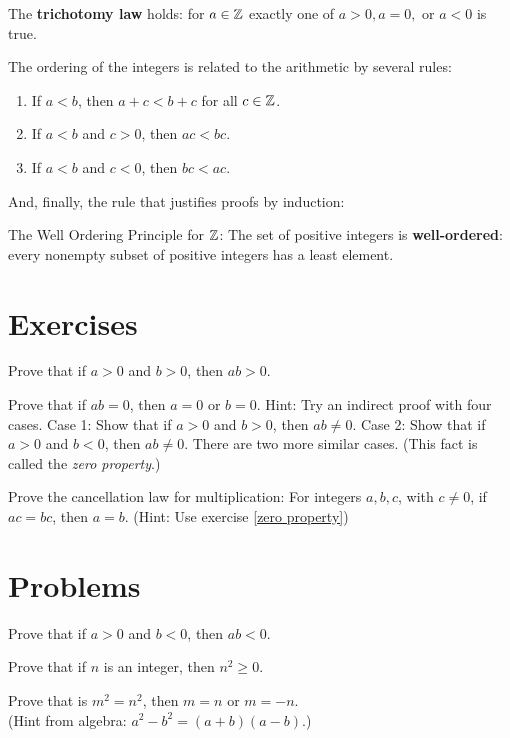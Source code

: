  The {\bfseries trichotomy law} holds: 
 for $a\in \mathbb{Z}$ exactly one of $a>0, a=0,$ or  $a<0$ is true.

The ordering of the integers is related to the arithmetic by several rules:
\begin{enumerate}

 \item If $a<b$, then $a+c<b+c$ for all $c\in \mathbb{Z}$.
 
 \item If $a<b$ and $c>0$, then $ac<bc$.
 
 \item If $a<b$ and $c<0$, then $bc<ac$.
\end{enumerate}

And, finally, the rule that justifies proofs by induction:

The Well Ordering Principle for $\mathbb{Z}$:
 The set of positive integers is {\bfseries well-ordered}: 
  every nonempty subset of positive integers has a least element. 


\clearpage
\section{Exercises}

\begin{exer} 
Prove that if $a>0$ and $b>0$, then $ab>0$.
\end{exer}

\begin{exer}\label{zero property}
Prove that if $ab=0$, then $a=0$ or $b=0$.  Hint: Try an indirect proof with four cases.
Case 1: Show that if $a>0$ and $b>0$, then $ab\not=0$. Case 2: Show that if $a>0$ and $b<0$,
then $ab\not=0$. There are two  more similar cases. (This fact is called the {\it zero property}.)
\end{exer}

\begin{exer} 
Prove the cancellation law for multiplication: 
For integers $a,b,c$, with $c\not=0$, if $ac=bc$, then $a=b$. (Hint: Use exercise \ref{zero property})
\end{exer}



\section{Problems}

\begin{prob}
Prove that if $a>0$ and $b<0$, then $ab <0$.
\end{prob}

\begin{prob}
Prove that if $n$ is an integer, then $n^{2}\geq 0$.
\end{prob}

\begin{prob}
Prove that is $m^{2} = n^{2}$, then $m=n$ or $m = -n$.\\
 (Hint from algebra: $a^{2}-b^{2} = (a+b)(a-b)$.) 
\end{prob}





